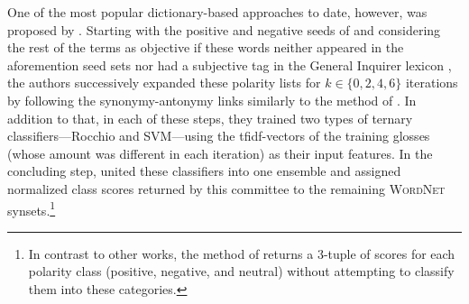 
One of the most popular dictionary-based approaches to date, however,
was proposed by \citet{Esuli:06c}.  Starting with the positive and
negative seeds of \citet{Turney:03} and considering the rest of the
terms as objective if these words neither appeared in the aforemention
seed sets nor had a subjective tag in the General Inquirer lexicon
\cite{Stone:66}, the authors successively expanded these polarity
lists for $k \in \{0, 2, 4, 6\}$ iterations by following the
synonymy-antonymy links similarly to the method of \citet{Hu:04}.  In
addition to that, in each of these steps, they trained two types of
ternary classifiers---Rocchio and SVM---using the tfidf-vectors of the
training glosses (whose amount was different in each iteration) as
their input features.  In the concluding step, \citet{Esuli:06c}
united these classifiers into one ensemble and assigned normalized
class scores returned by this committee to the remaining
\textsc{WordNet} synsets.\footnote{In contrast to other works, the
  method of \citet{Esuli:06c} returns a 3-tuple of scores for each
  polarity class (positive, negative, and neutral) without attempting
  to classify them into these categories.}


